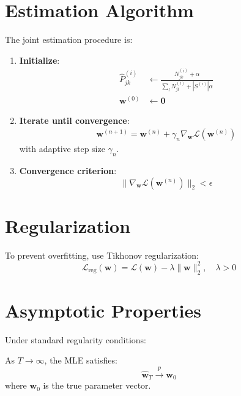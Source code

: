 \documentclass[answers,12pt,addpoints]{exam}
\begin{document}
\section{Estimation Algorithm}
The joint estimation procedure is:

\begin{enumerate}
    \item \textbf{Initialize}:
    \begin{align*}
        \hat{P}^{(i)}_{jk} &\gets \frac{N^{(i)}_{jk} + \alpha}{\sum_l N^{(i)}_{jl} + |S^{(i)}|\alpha} \\
        \mathbf{w}^{(0)} &\gets \mathbf{0}
    \end{align*}
    
    \item \textbf{Iterate until convergence}:
    \begin{align*}
        \mathbf{w}^{(n+1)} = \mathbf{w}^{(n)} + \gamma_n \nabla_{\mathbf{w}} \mathcal{L}(\mathbf{w}^{(n)})
    \end{align*}
    with adaptive step size $\gamma_n$.
    
    \item \textbf{Convergence criterion}:
    \begin{equation}
        \| \nabla_{\mathbf{w}} \mathcal{L}(\mathbf{w}^{(n)}) \|_2 < \epsilon
    \end{equation}
\end{enumerate}

\section{Regularization}
To prevent overfitting, use Tikhonov regularization:
\begin{equation}
\mathcal{L}_{\text{reg}}(\mathbf{w}) = \mathcal{L}(\mathbf{w}) - \lambda \|\mathbf{w}\|_2^2, \quad \lambda > 0
\end{equation}

\section{Asymptotic Properties}
Under standard regularity conditions:

\begin{theorem}[Consistency]
As $T \to \infty$, the MLE satisfies:
\begin{equation}
\hat{\mathbf{w}}_T \xrightarrow{p} \mathbf{w}_0
\end{equation}
where $\mathbf{w}_0$ is the true parameter vector.
\end{theorem}
\end{document}
